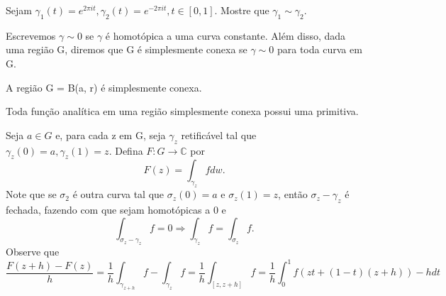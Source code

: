 \documentclass[complex.tex]{subfiles}
\begin{document}
\begin{exer*}
	Sejam $\gamma_{1}(t) = e^{2\pi it}, \gamma_{2}(t) = e^{-2\pi it}, t\in[0, 1]$. Mostre que $\gamma_{1}\sim \gamma_{2}.$
\end{exer*}
Escrevemos $\gamma\sim0$ se $\gamma$ é homotópica a uma curva constante. Além disso, dada uma região G, diremos que
G é simplesmente conexa se $\gamma\sim0$ para toda curva em G.
\begin{exer*}
	A região G = B(a, r) é simplesmente conexa.
\end{exer*}
\begin{theorem*}
	Toda função analítica em uma região simplesmente conexa possui uma primitiva.
\end{theorem*}
\begin{proof*}
	Seja $a\in{G}$ e, para cada z em G, seja $\gamma_{z}$ retificável tal que $\gamma_{z}(0) = a, \gamma_{z}(1) = z.$ Defina
	$F:G\rightarrow \mathbb{C}$ por
	$$
		F(z) = \int_{\gamma_{z}}^{}fdw.
	$$
	Note que se $\sigma_{2}$ é outra curva tal que $\sigma_{z}(0) = a$ e $\sigma_{z}(1) = z$, então $\sigma_{z} - \gamma_{z}$
	é fechada, fazendo com que sejam homotópicas a 0 e
	$$
		\int_{\sigma_{z}-\gamma_{z}}^{}f = 0\Rightarrow \int_{\gamma_{z}}^{}f = \int_{\sigma_{z}}^{}f.
	$$
	Observe que
	$$
		\frac{F(z+h) - F(z)}{h} = \frac{1}{h}\int_{\gamma_{z+h}}^{}f - \int_{\gamma_{z}}^{}f = \frac{1}{h}\int_{[z, z+h]}^{}f = \frac{1}{h}\int_{0}^{1}f(zt + (1-t)(z+h))-hdt
	$$
\end{proof*}
\end{document}
